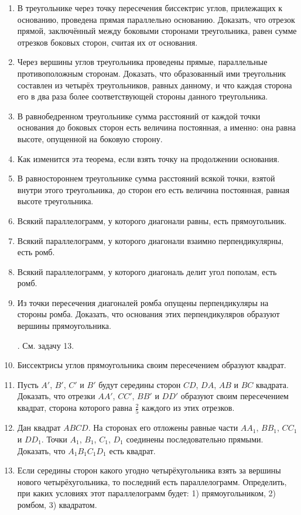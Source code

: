 \documentclass[oneside]{book}
\begin{document}
\begin{enumerate}
 \item
В треугольнике через точку пересечения биссектрис углов, прилежащих к основанию, проведена прямая параллельно основанию.
Доказать, что отрезок прямой, заключённый между боковыми сторонами треугольника, равен сумме отрезков боковых сторон, считая их от основания.

 \item
Через вершины углов треугольника проведены прямые, параллельные противоположным сторонам.
Доказать, что образованный ими треугольник составлен из четырёх треугольников, равных данному, и что каждая сторона его в два раза более соответствующей стороны данного треугольника.

 \item
В равнобедренном треугольнике сумма расстояний от каждой точки основания до боковых сторон есть величина постоянная, а именно:
она равна высоте, опущенной на боковую сторону.

 \item
Как изменится эта теорема, если взять точку на продолжении основания.

 \item
В равностороннем треугольнике сумма расстояний всякой точки, взятой внутри этого треугольника, до сторон его есть величина постоянная, равная высоте треугольника.

 \item
Всякий параллелограмм, у которого диагонали равны, есть прямоугольник.

 \item
Всякий параллелограмм, у которого диагонали взаимно перпендикулярны, есть ромб.

 \item
Всякий параллелограмм, у которого диагональ делит угол пополам, есть ромб.

 \item
Из точки пересечения диагоналей ромба опущены перпендикуляры на стороны ромба.
Доказать, что основания этих перпендикуляров образуют вершины прямоугольника.

.
См.
задачу 13.

 \item
Биссектрисы углов прямоугольника своим пересечением образуют квадрат.

 \item
Пусть $A'$, $B'$, $C'$ и $B'$ будут середины сторон $CD$, $DA$, $AB$ и $BC$ квадрата.
Доказать, что отрезки $AA'$, $CC'$, $BB'$ и $DD'$ образуют своим пересечением квадрат, сторона которого равна $\tfrac25$ каждого из этих отрезков.

 \item
Дан квадрат $ABCD$.
На сторонах его отложены равные части $AA_1$, $BB_1$, $CC_1$ и $DD_1$.
Точки $A_1$, $B_1$, $C_1$, $D_1$ соединены последовательно прямыми.
Доказать, что $A_1B_1C_1D_1$ есть квадрат.

 \item
Если середины сторон какого угодно четырёхугольника взять за вершины нового четырёхугольника, то последний есть параллелограмм.
Определить, при каких условиях этот параллелограмм будет:
1) прямоугольником, 2) ромбом, 3) квадратом.

\end{enumerate}
\end{document}
